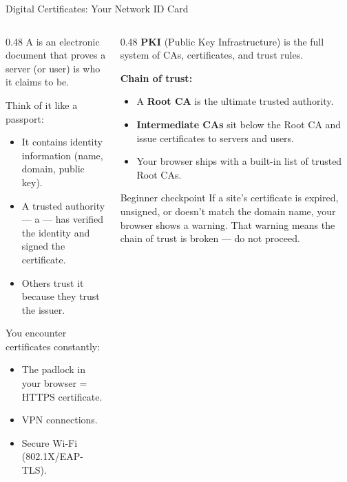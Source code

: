 \documentclass[aspectratio=169]{beamer}  %
\begin{document}
\begin{frame}{Digital Certificates: Your Network ID Card}
    \begin{columns}[T]
        \begin{column}{0.48\textwidth}
            \footnotesize
            A  is an electronic document that proves a server (or user) is who it claims to be.

            \vspace{0.3em}
            Think of it like a passport:
            \begin{itemize}
                \item It contains identity information (name, domain, public key).
                \item A trusted authority --- a  --- has verified the identity and signed the certificate.
                \item Others trust it because they trust the issuer.
            \end{itemize}

            \vspace{0.3em}
            You encounter certificates constantly:
            \begin{itemize}
                \item The padlock in your browser = HTTPS certificate.
                \item VPN connections.
                \item Secure Wi-Fi (802.1X/EAP-TLS).
            \end{itemize}
        \end{column}
        \begin{column}{0.48\textwidth}
            \footnotesize
            \textbf{PKI} (Public Key Infrastructure) is the full system of CAs, certificates, and trust rules.

            \vspace{0.3em}
            \textbf{Chain of trust:}
            \begin{itemize}
                \item A \textbf{Root CA} is the ultimate trusted authority.
                \item \textbf{Intermediate CAs} sit below the Root CA and issue certificates to servers and users.
                \item Your browser ships with a built-in list of trusted Root CAs.
            \end{itemize}

            \begin{exampleblock}{Beginner checkpoint}
                \footnotesize
                If a site's certificate is expired, unsigned, or doesn't match the domain name, your browser shows a warning. That warning means the chain of trust is broken --- do not proceed.
            \end{exampleblock}
        \end{column}
    \end{columns}
\end{frame}
\end{document}
